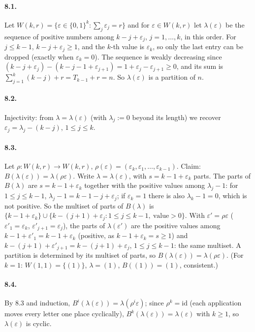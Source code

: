 \documentclass[11pt]{article}
\begin{document}
\paragraph{8.1.} Let $W(k,r)=\{\varepsilon\in\{0,1\}^k:\sum_j\varepsilon_j=r\}$ and for $\varepsilon\in W(k,r)$ let
$\lambda(\varepsilon)$ be the sequence of positive numbers among $k-j+\varepsilon_j$, $j=1,\ldots,k$, in this order.
For $j\le k-1$, $k-j+\varepsilon_j\ge1$, and the $k$-th value is $\varepsilon_k$, so only the last entry can be
dropped (exactly when $\varepsilon_k=0$). The sequence is weakly decreasing since
$(k-j+\varepsilon_j)-(k-j-1+\varepsilon_{j+1})=1+\varepsilon_j-\varepsilon_{j+1}\ge0$, and its sum is
$\sum_{j=1}^k(k-j)+r=T_{k-1}+r=n$. So $\lambda(\varepsilon)$ is a partition of $n$.

\paragraph{8.2.} Injectivity: from $\lambda=\lambda(\varepsilon)$ (with $\lambda_j:=0$ beyond its length) we recover
$\varepsilon_j=\lambda_j-(k-j)$, $1\le j\le k$.

\paragraph{8.3.} Let $\rho:W(k,r)\to W(k,r)$, $\rho(\varepsilon)=(\varepsilon_k,\varepsilon_1,\ldots,\varepsilon_{k-1})$.
Claim: $B(\lambda(\varepsilon))=\lambda(\rho\varepsilon)$. Write $\lambda=\lambda(\varepsilon)$, with
$s=k-1+\varepsilon_k$ parts. The parts of $B(\lambda)$ are $s=k-1+\varepsilon_k$ together with the positive values
among $\lambda_j-1$: for $1\le j\le k-1$, $\lambda_j-1=k-1-j+\varepsilon_j$; if $\varepsilon_k=1$ there is also
$\lambda_k-1=0$, which is not positive. So the multiset of parts of $B(\lambda)$ is
$\{k-1+\varepsilon_k\}\cup\{k-(j+1)+\varepsilon_j:1\le j\le k-1,\ \text{value}>0\}$. With $\varepsilon'=\rho\varepsilon$
($\varepsilon'_1=\varepsilon_k$, $\varepsilon'_{j+1}=\varepsilon_j$), the parts of $\lambda(\varepsilon')$ are the
positive values among $k-1+\varepsilon'_1=k-1+\varepsilon_k$ (positive, as $k-1+\varepsilon_k=s\ge1$) and
$k-(j+1)+\varepsilon'_{j+1}=k-(j+1)+\varepsilon_j$, $1\le j\le k-1$: the same multiset. A partition is determined by
its multiset of parts, so $B(\lambda(\varepsilon))=\lambda(\rho\varepsilon)$. (For $k=1$: $W(1,1)=\{(1)\}$,
$\lambda=(1)$, $B((1))=(1)$, consistent.)

\paragraph{8.4.} By 8.3 and induction, $B^i(\lambda(\varepsilon))=\lambda(\rho^i\varepsilon)$; since
$\rho^k=\mathrm{id}$ (each application moves every letter one place cyclically),
$B^k(\lambda(\varepsilon))=\lambda(\varepsilon)$ with $k\ge1$, so $\lambda(\varepsilon)$ is cyclic.
\end{document}
